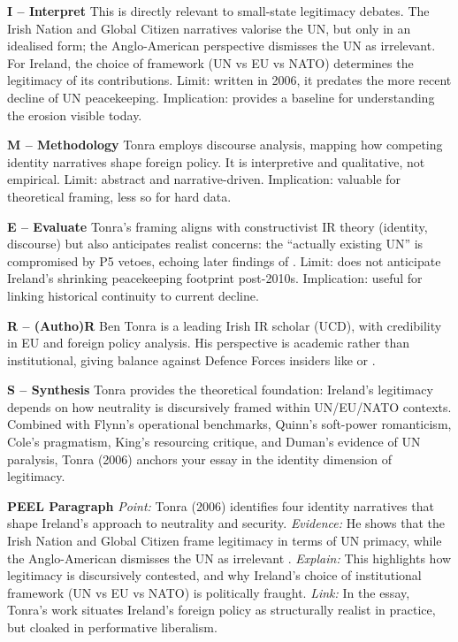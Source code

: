 \textbf{I – Interpret}  
This is directly relevant to small-state legitimacy debates. The Irish Nation and Global Citizen narratives valorise the UN, but only in an idealised form; the Anglo-American perspective dismisses the UN as irrelevant. For Ireland, the choice of framework (UN vs EU vs NATO) determines the legitimacy of its contributions. Limit: written in 2006, it predates the more recent decline of UN peacekeeping. Implication: provides a baseline for understanding the erosion visible today.  

\textbf{M – Methodology}  
Tonra employs discourse analysis, mapping how competing identity narratives shape foreign policy. It is interpretive and qualitative, not empirical. Limit: abstract and narrative-driven. Implication: valuable for theoretical framing, less so for hard data.  

\textbf{E – Evaluate}  
Tonra’s framing aligns with constructivist IR theory (identity, discourse) but also anticipates realist concerns: the “actually existing UN” is compromised by P5 vetoes, echoing later findings of \parencite{DUMAN_RAKIPOGLU_2025}. Limit: does not anticipate Ireland’s shrinking peacekeeping footprint post-2010s. Implication: useful for linking historical continuity to current decline.  

\textbf{R – (Autho)R}  
Ben Tonra is a leading Irish IR scholar (UCD), with credibility in EU and foreign policy analysis. His perspective is academic rather than institutional, giving balance against Defence Forces insiders like \parencite{QUINN_2018} or \parencite{KING_2021}.  

\textbf{S – Synthesis}  
Tonra provides the theoretical foundation: Ireland’s legitimacy depends on how neutrality is discursively framed within UN/EU/NATO contexts. Combined with Flynn’s operational benchmarks, Quinn’s soft-power romanticism, Cole’s pragmatism, King’s resourcing critique, and Duman’s evidence of UN paralysis, Tonra (2006) anchors your essay in the identity dimension of legitimacy.  

\textbf{PEEL Paragraph}  
\textit{Point:} Tonra (2006) identifies four identity narratives that shape Ireland’s approach to neutrality and security.  
\textit{Evidence:} He shows that the Irish Nation and Global Citizen frame legitimacy in terms of UN primacy, while the Anglo-American dismisses the UN as irrelevant \parencite{TONRA_2006}.  
\textit{Explain:} This highlights how legitimacy is discursively contested, and why Ireland’s choice of institutional framework (UN vs EU vs NATO) is politically fraught.  
\textit{Link:} In the essay, Tonra’s work situates Ireland’s foreign policy as structurally realist in practice, but cloaked in performative liberalism.  

